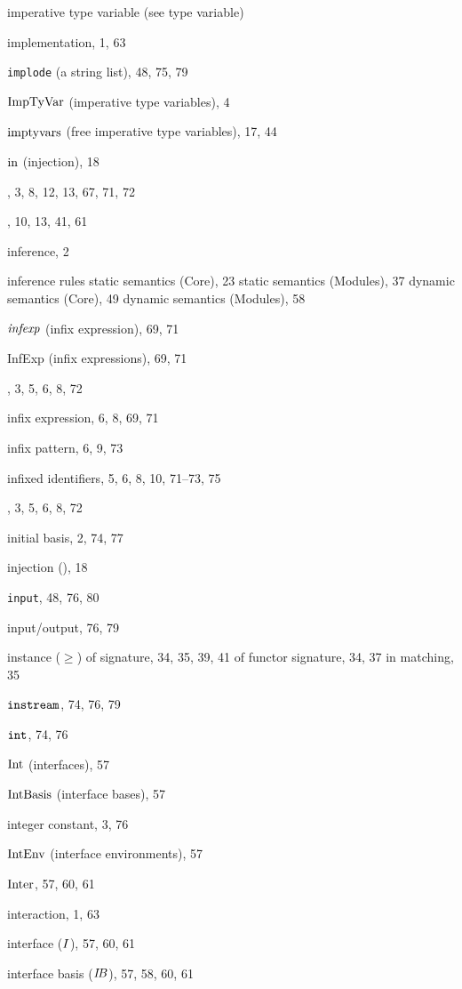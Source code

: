 \begin{theindex}
\item imperative type variable (see type variable) 
\item implementation, 1, 63
\item {\tt implode} (a string list), 48, 75, 79
\item ${\rm ImpTyVar}$ (imperative type variables), 4
\item $\mathop{\rm imptyvars}\nolimits$ (free imperative type variables), 17, 44
\item $\mbox{\rm in}$ (injection), 18
\item \IN, 3, 8, 12, 13, 67, 71, 72
\item \INCLUDE, 10, 13, 41, 61
\item inference, 2
\item inference rules 
\subitem static semantics (Core), 23
\subitem static semantics (Modules), 37
\subitem dynamic semantics (Core), 49
\subitem dynamic semantics (Modules), 58
\item ${\it infexp}$ (infix expression), 69, 71
\item InfExp (infix expressions), 69, 71
\item \INFIX, 3, 5, 6, 8, 72
\item infix expression, 6, 8, 69, 71
\item infix pattern, 6, 9, 73
\item infixed identifiers, 5, 6, 8, 10, 71--73, 75
\item \INFIXR, 3, 5, 6, 8, 72
\item initial basis, 2, 74, 77
\item injection (\In), 18
\item {\tt input}, 48, 76, 80
\item input/output, 76, 79
\item instance ($\geq$) 
\subitem of signature, 34, 35, 39, 41
\subitem of functor signature, 34, 37
\subitem in matching, 35
\item $\mbox{\tt instream}$, 74, 76, 79
\item $\mbox{\tt int}$, 74, 76
\item ${\rm Int}$ (interfaces), 57
\item ${\rm IntBasis}$ (interface bases), 57
\item integer constant, 3, 76
\item ${\rm IntEnv}$ (interface environments), 57
\item $\mathop{\rm Inter}\nolimits$, 57, 60, 61
\item interaction, 1, 63
\item interface ($I$), 57, 60, 61
\item interface basis ($\mbox{$I\!B$}$), 57, 58, 60, 61

\end{theindex}
